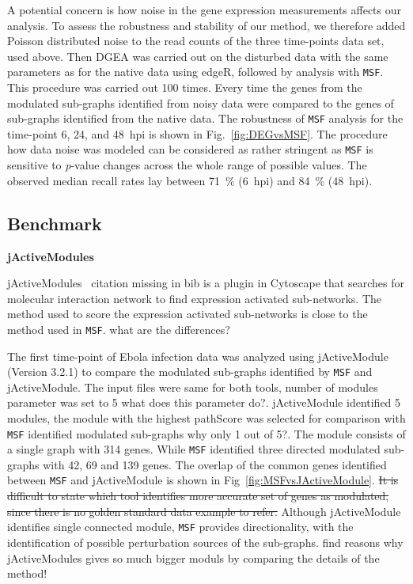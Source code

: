 \documentclass[10pt,a4paper,twocolumn]{article}
\newcommand{\TODO}[1]{\begingroup\color{red}#1\endgroup}
\begin{document}
	A potential concern is how noise in the gene expression
        measurements affects our analysis. To assess the robustness
        and stability of our method, we therefore added Poisson
        distributed noise to the read counts of the three time-points
        data set, used above.  Then DGEA was carried out on the
        disturbed data with the same parameters as for the native data
        using edgeR, followed by analysis with \texttt{MSF}. This
        procedure was carried out 100 times.  Every time the genes
        from the modulated sub-graphs identified from noisy data were
        compared to the genes of sub-graphs identified from the native
        data. The robustness of \texttt{MSF} analysis for the
        time-point 6, 24, and 48~hpi is shown in
        Fig.~\ref{fig:DEGvsMSF}. The procedure how data noise was
        modeled can be considered as rather stringent as \texttt{MSF}
        is sensitive to \textit{p}-value changes across the whole
        range of possible values. The observed median recall rates lay
        between 71~\% (6~hpi) and 84~\% (48~hpi).
	
	\subsection*{Benchmark}
	
	
	\textbf{jActiveModules}
	
	jActiveModules~\cite{jActiveModules} \TODO{citation missing in
          bib} is a plugin in Cytoscape that searches for molecular
        interaction network to find expression activated
        sub-networks. The method used to score the expression
        activated sub-networks is close to the method used in
        \texttt{MSF}. \TODO{what are the differences?}
	
	The first time-point of Ebola infection data was analyzed
        using jActiveModule (Version 3.2.1) to compare the modulated
        sub-graphs identified by \texttt{MSF} and jActiveModule. The
        input files were same for both tools, number of modules
        parameter was set to 5 \TODO{what does this parameter
          do?}. jActiveModule identified 5 modules, the module with
        the highest pathScore was selected for comparison with
        \texttt{MSF} identified modulated sub-graphs \TODO{why only 1
          out of 5?}. The module consists of a single graph with 314
        genes. While \texttt{MSF} identified three directed modulated
        sub-graphs with 42, 69 and 139 genes. The overlap of the
        common genes identified between \texttt{MSF} and jActiveModule
        is shown in Fig~\ref{fig:MSFvsJActiveModule}. \sout{It is
          difficult to state which tool identifies more accurate set
          of genes as modulated, since there is no golden standard
          data example to refer.} Although jActiveModule identifies
        single connected module, \texttt{MSF} provides directionality,
        with the identification of possible perturbation sources of
        the sub-graphs. \TODO{find reasons why jActiveModules gives so
          much bigger moduls by comparing the details of the method!}
	
\end{document}
